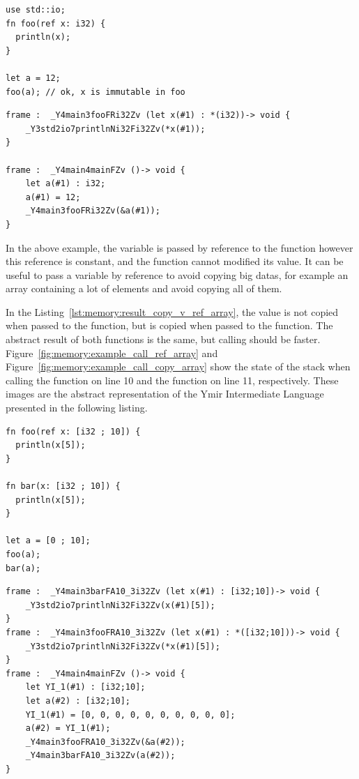 \begin{lstlisting}[style=coloredverbatim]
use std::io;
fn foo(ref x: i32) {
  println(x);
}

let a = 12;
foo(a); // ok, x is immutable in foo
\end{lstlisting}

\begin{lstlisting}[style=lyilVerb]
frame :  _Y4main3fooFRi32Zv (let x(#1) : *(i32))-> void {
    _Y3std2io7printlnNi32Fi32Zv(*x(#1));
}

frame :  _Y4main4mainFZv ()-> void {
    let a(#1) : i32;
    a(#1) = 12;
    _Y4main3fooFRi32Zv(&a(#1));
}
\end{lstlisting}

In the above example, the variable  is passed by reference to the
function  however this reference is constant, and the function
 cannot modified its value. It can be useful to pass a variable by
reference to avoid copying big datas, for example an array containing a lot of
elements and avoid copying all of them.



In the Listing~\ref{lst:memory:result_copy_v_ref_array}, the value is not copied when passed to the 
function, but is copied when passed to the  function. The abstract
result of both functions is the same, but calling  should be faster.
Figure~\ref{fig:memory:example_call_ref_array} and
Figure~\ref{fig:memory:example_call_copy_array} show the state of the stack when
calling the  function on line 10 and the  function on
line 11, respectively. These images are the abstract representation of the Ymir
Intermediate Language presented in the following listing.

\begin{lstlisting}[style=coloredverbatim, label=lst:memory:result_copy_v_ref_array, caption=Example of passing an array by reference vs. by value]
fn foo(ref x: [i32 ; 10]) {
  println(x[5]);
}

fn bar(x: [i32 ; 10]) {
  println(x[5]);
}

let a = [0 ; 10];
foo(a);
bar(a);
\end{lstlisting}

\begin{lstlisting}[style=lyilVerb, caption=YIL result of Listing~\ref{lst:memory:result_copy_v_ref_array}]
frame :  _Y4main3barFA10_3i32Zv (let x(#1) : [i32;10])-> void {
    _Y3std2io7printlnNi32Fi32Zv(x(#1)[5]);
}
frame :  _Y4main3fooFRA10_3i32Zv (let x(#1) : *([i32;10]))-> void {
    _Y3std2io7printlnNi32Fi32Zv(*x(#1)[5]);
}
frame :  _Y4main4mainFZv ()-> void {
    let YI_1(#1) : [i32;10];
    let a(#2) : [i32;10];
    YI_1(#1) = [0, 0, 0, 0, 0, 0, 0, 0, 0, 0];
    a(#2) = YI_1(#1);
    _Y4main3fooFRA10_3i32Zv(&a(#2));
    _Y4main3barFA10_3i32Zv(a(#2));
}
\end{lstlisting}

